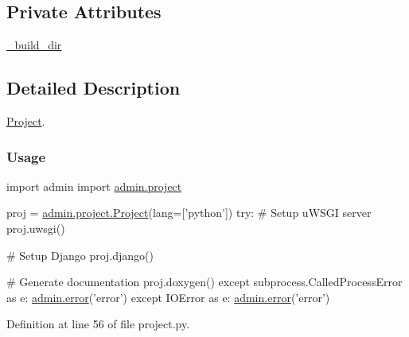\subsection*{Private Attributes}
\begin{DoxyCompactItemize}
\item 
\hyperlink{classadmin_1_1project_1_1Project_a9357a34aaccfd3fc391b4081f6794ee8}{\-\_\-build\-\_\-dir}
\end{DoxyCompactItemize}


\subsection{Detailed Description}
\hyperlink{classadmin_1_1project_1_1Project}{Project}. 

\subsubsection*{Usage}


\begin{DoxyPre}{\ttfamily 
      import admin
      import \hyperlink{namespaceadmin_1_1project}{admin.project}}\end{DoxyPre}



\begin{DoxyPre}{\ttfamily       proj = \hyperlink{classadmin_1_1project_1_1Project}{admin.project.Project}(lang=['python'])
      try:
          \# Setup uWSGI server
          proj.uwsgi()}\end{DoxyPre}



\begin{DoxyPre}{\ttfamily           \# Setup Django
          proj.django()}\end{DoxyPre}



\begin{DoxyPre}{\ttfamily           \# Generate documentation
          proj.doxygen()
      except subprocess.CalledProcessError as e:
          \hyperlink{namespaceadmin_ae1e80d1a965f6551fa95ff379ba2b0cd}{admin.error}('error')
      except IOError as e:
          \hyperlink{namespaceadmin_ae1e80d1a965f6551fa95ff379ba2b0cd}{admin.error}('error')
  }\end{DoxyPre}
 

Definition at line 56 of file project.\-py.



